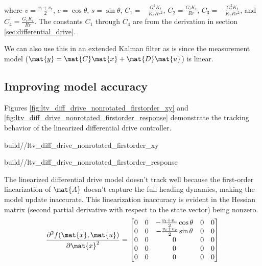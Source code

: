\begin{theorem}
  where $v = \frac{v_l + v_r}{2}$, $c = \cos\theta$, $s = \sin\theta$,
  $C_1 = -\frac{G_l^2 K_t}{K_v R r^2}$, $C_2 = \frac{G_l K_t}{Rr}$,
  $C_3 = -\frac{G_r^2 K_t}{K_v R r^2}$, and $C_4 = \frac{G_r K_t}{Rr}$. The
  constants $C_1$ through $C_4$ are from the derivation in section
  \ref{sec:differential_drive}.
\end{theorem}

We can also use this in an extended Kalman filter as is since the measurement
model ($\mat{y} = \mat{C}\mat{x} + \mat{D}\mat{u}$) is linear.

\subsection{Improving model accuracy}

Figures \ref{fig:ltv_diff_drive_nonrotated_firstorder_xy} and
\ref{fig:ltv_diff_drive_nonrotated_firstorder_response} demonstrate the
tracking behavior of the linearized differential drive controller.
\begin{bookfigure}
  \begin{minisvg}{2}{build/\chapterpath/ltv_diff_drive_nonrotated_firstorder_xy}
    \caption{Linear time-varying differential drive controller x-y plot
      (first-order)}
    \label{fig:ltv_diff_drive_nonrotated_firstorder_xy}
  \end{minisvg}
  \hfill
  \begin{minisvg}{2}{build/\chapterpath/ltv_diff_drive_nonrotated_firstorder_response}
    \caption{Linear time-varying differential drive controller response
      (first-order)}
    \label{fig:ltv_diff_drive_nonrotated_firstorder_response}
  \end{minisvg}
\end{bookfigure}

The linearized differential drive model doesn't track well because the
first-order linearization of $\mat{A}$ doesn't capture the full heading
dynamics, making the \gls{model} update inaccurate. This linearization
inaccuracy is evident in the Hessian matrix (second partial derivative with
respect to the state vector) being nonzero.
\begin{equation*}
  \frac{\partial^2 f(\mat{x}, \mat{u})}{\partial\mat{x}^2} =
  \begin{bmatrix}
    0 & 0 & -\frac{v_l + v_r}{2}\cos\theta & 0 & 0 \\
    0 & 0 & -\frac{v_l + v_r}{2}\sin\theta & 0 & 0 \\
    0 & 0 & 0 & 0 & 0 \\
    0 & 0 & 0 & 0 & 0 \\
    0 & 0 & 0 & 0 & 0
  \end{bmatrix}
\end{equation*}


